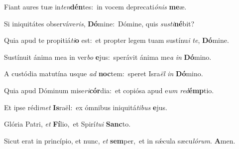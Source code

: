 Fiant aures tuæ in\textit{ten}\textbf{dén}tes:~\redgreheightstar in vocem deprecati\textit{ó}\textit{nis} \textbf{me}æ.

Si iniquitátes observáve\textit{ris}, \textbf{Dó}mine:~\redgreheightstar Dómine, quis \textit{sus}\textit{ti}\textbf{né}bit?

Quia apud te propitiá\textit{ti}\textbf{o} est:~\redgreheightstar et propter legem tuam sustínu\textit{i} \textit{te}, \textbf{Dó}mine.

Sustínuit ánima mea in ver\textit{bo} \textbf{e}jus:~\redgreheightstar sperávit ánima me\textit{a} \textit{in} \textbf{Dó}mino.

A custódia matutína usque \textit{ad} \textbf{noc}tem:~\redgreheightstar speret Isra\textit{ël} \textit{in} \textbf{Dó}mino.

Quia apud Dóminum mise\textit{ri}\textbf{cór}dia:~\redgreheightstar et copiósa apud e\textit{um} \textit{red}\textbf{émp}tio.

Et ipse rédi\textit{met} \textbf{Is}raël:~\redgreheightstar ex ómnibus iniquitá\textit{ti}\textit{bus} \textbf{e}jus.

Glória Patri, \textit{et} \textbf{Fí}lio,~\redgreheightstar et Spirí\textit{tu}\textit{i} \textbf{Sanc}to.

Sicut erat in princípio, et nunc, \textit{et} \textbf{sem}per,~\redgreheightstar et in sǽcula sæcu\textit{ló}\textit{rum}. \textbf{A}men.


